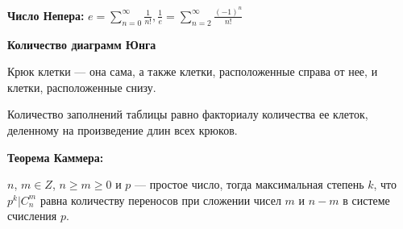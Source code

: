 \textbf{Число Непера:} $e = \sum\limits_{n = 0}^\infty \frac1{n!}, \frac1e = \sum\limits_{n = 2}^\infty \frac{(-1)^n}{n!}$

\textbf{Количество диаграмм Юнга}

Крюк клетки --- она сама, а также клетки, расположенные справа от нее, и клетки, расположенные снизу.

Количество заполнений таблицы равно факториалу количества ее клеток, деленному на произведение длин всех крюков.

\textbf{Теорема Каммера:}

$n$, $m\in Z$, $n\geq  m\geq  0$ и $p$ --- простое число, тогда максимальная степень $k$, что $p^k | C_n^m$ равна количеству переносов при сложении чисел $m$ и $n - m$ в системе счисления $p$.
